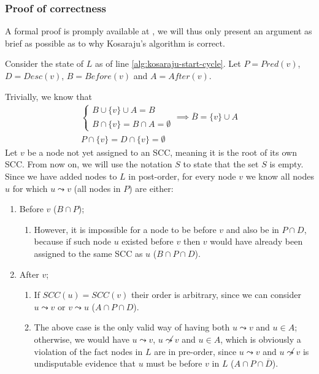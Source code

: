 \subsubsection{Proof of correctness}
A formal proof is promply available at \cite[p.~619]{intro-alg}, we will thus only present an argument as brief as possible as to why Kosaraju's algorithm is correct.\par
Consider the state of $L$ as of line \ref{alg:kosaraju-start-cycle}. Let $P = Pred(v)$, $D = Desc(v)$, $B = Before(v)$ and $A=After(v)$.\par
Trivially, we know that
\begin{gather} \label{eq:ABpart}
    \begin{cases}
        B \cup \{v\} \cup A = B \\
        B \cap \{v\} = B \cap A = \emptyset
    \end{cases} \implies \overline{B} = \{v\} \cup A \\
    \label{eq:vnotinPD}
    P \cap \{v\} = D\cap\{v\}=\emptyset
\end{gather}
Let $v$ be a node not yet assigned to an \acrshort*{SCC}, meaning it is the root of its own \acrshort*{SCC}. From now on, we will use the notation \sout{$S$} to state that the set $S$ is empty.
Since we have added nodes to $L$ in post-order, for every node $v$ we know all nodes $u$ for which $u \leadsto v$ (all nodes in $P$) are either:
\begin{enumerate}[topsep=0.5em]
    \item \label{itm:B} Before $v$ ($B \cap P$);
    \begin{enumerate}[topsep=0em]
        \item \label{itm:Bexcept} However, it is impossible for a node to be before $v$ and also be in $P \cap D$, because if such node $u$ existed before $v$ then $v$ would have already been assigned to the same \acrshort*{SCC} as $u$ (\sout{$B \cap P \cap D$}).
    \end{enumerate} 
    \item \label{itm:A} After $v$;
    \begin{enumerate}[topsep=0em]
        \item \label{itm:Agood} If $SCC(u)=SCC(v)$ their order is arbitrary, since we can consider $u \leadsto v$ or $v \leadsto u$ ($A \cap P \cap D$).
        \item \label{itm:Abad} The above case is the only valid way of having both $u \leadsto v$ and $u \in A$; otherwise, we would have $u \leadsto v$, $u \not \leadsto v$ and $u \in A$, which is obviously a violation of the fact nodes in $L$ are in pre-order, since $u \leadsto v$ and $u \not \leadsto v$ is undisputable evidence that $u$ must be before $v$ in $L$ (\sout{$A \cap P \cap \overline{D}$}).
    \end{enumerate}
\end{enumerate}
